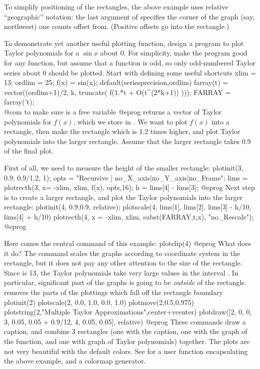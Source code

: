 To simplify positioning of the rectangles, the above example uses relative
``geographic'' notation: the last argument of  specifies the
corner of the graph (say, northwest) one counts offset from. (Positive
offsets go into the rectangle.)

To demonstrate yet another useful plotting function, design a program to
plot Taylor polynomials for a $\sin x$ about 0.  For simplicity, make the
program good for any function, but assume that a function is odd, so only
odd-numbered Taylor series about 0 should be plotted.  Start with defining
some useful shortcuts
\bprog
  xlim = 13;  ordlim = 25;  f(x) = sin(x);
  default(seriesprecision,ordlim)
  farray(t) = vector((ordlim+1)/2, k, truncate( f(1.*t + O(t^(2*k+1)) )));
  FARRAY = farray('t);  \\@com{} to make sure  is a free variable
@eprog\noindent
{} returns a vector of Taylor polynomials for $f(x)$, which we
store in .  We want to plot $f(x)$ into a rectangle, then make
the rectangle which is 1.2 times higher, and plot Taylor polynomials into the
larger rectangle.  Assume that the larger rectangle takes 0.9 of the final
plot.

First of all, we need to measure the height of the smaller rectangle:
\bprog
  plotinit(3, 0.9, 0.9/1.2, 1);
  opts = "Recursive | no_X_axis|no_Y_axis|no_Frame";
  lims = plotrecth(3, x= -xlim, xlim, f(x), opts,16);
  h = lims[4] - lims[3];
@eprog\noindent
Next step is to create a larger rectangle, and plot the Taylor polynomials
into the larger rectangle:
\bprog
  plotinit(4, 0.9,0.9, relative);
  plotscale(4, lims[1], lims[2], lims[3] - h/10, lims[4] + h/10)
  plotrecth(4, x = -xlim, xlim, subst(FARRAY,t,x), "no_Rescale");
@eprog

Here comes the central command of this example:
\bprog
  plotclip(4)
@eprog\noindent
What does it do?  The command  scales the
graphs according to coordinate system in the rectangle, but it does not pay
any other attention to the size of the rectangle.  Since  is 13,
the Taylor polynomials take very large values in the interval
.  In particular, significant part of the graphs is going
to be \emph{outside} of the rectangle.  removes the parts of
the plottings which fall off the rectangle boundary
\bprog
  plotinit(2)
  plotscale(2, 0.0, 1.0, 0.0, 1.0)
  plotmove(2,0.5,0.975)
  plotstring(2,"Multiple Taylor Approximations",center+vcenter)
  plotdraw([2, 0, 0,  3, 0.05, 0.05 + 0.9/12,  4, 0.05, 0.05], relative)
@eprog\noindent
These commands draw a caption, and combine 3 rectangles (one with the
caption, one with the graph of the function, and one with graph of Taylor
polynomials) together. The plots are not very beautiful with the default
colors. See  for a user function encapsulating the
above example, and a colormap generator.

